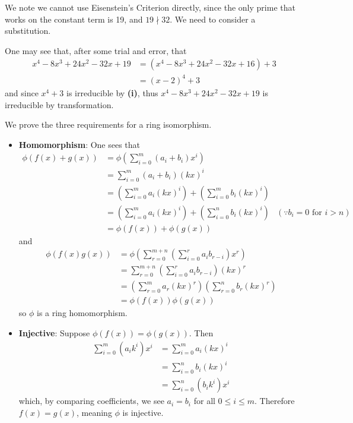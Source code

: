 \begin{questions}
\begin{partquestions}{\roman*}
        \item We note we cannot use Eisenstein's Criterion directly, since the only prime that works on the constant term is 19, and $19 \nmid 32$. We need to consider a substitution.

        One may see that, after some trial and error, that
        \begin{align*}
            x^4 - 8x^3 + 24x^2 - 32x + 19 &= (x^4 - 8x^3 + 24x^2 - 32x + 16) + 3\\
            &= (x - 2)^4 + 3
        \end{align*}
        and since $x^4 + 3$ is irreducible by \textbf{(i)}, thus $x^4 - 8x^3 + 24x^2 - 32x + 19$ is irreducible by transformation.
    \end{partquestions}

    \item We prove the three requirements for a ring isomorphism.
    \begin{itemize}
        \item \textbf{Homomorphism}: One sees that
        \begin{align*}
            \phi(f(x) + g(x)) &= \phi\left(\sum_{i=0}^m(a_i+b_i)x^i\right)\\
            &= \sum_{i=0}^m(a_i+b_i)(kx)^i\\
            &= \left(\sum_{i=0}^ma_i(kx)^i\right) + \left(\sum_{i=0}^mb_i(kx)^i\right)\\
            &= \left(\sum_{i=0}^ma_i(kx)^i\right) + \left(\sum_{i=0}^nb_i(kx)^i\right) & (\because b_i = 0 \text{ for } i > n)\\
            &= \phi(f(x)) + \phi(g(x))
        \end{align*}
        and
        \begin{align*}
            \phi(f(x)g(x)) &= \phi\left(\sum_{r=0}^{m+n}\left(\sum_{i=0}^ra_ib_{r-i}\right)x^r\right)\\
            &= \sum_{r=0}^{m+n}\left(\sum_{i=0}^ra_ib_{r-i}\right)(kx)^r\\
            &= \left(\sum_{r=0}^ma_r(kx)^r\right)\left(\sum_{r=0}^nb_r(kx)^r\right)\\
            &= \phi(f(x))\phi(g(x))
        \end{align*}
        so $\phi$ is a ring homomorphism.

        \item \textbf{Injective}: Suppose $\phi(f(x)) = \phi(g(x))$. Then
        \begin{align*}
            \sum_{i=0}^m(a_ik^i)x^i &= \sum_{i=0}^ma_i(kx)^i\\
            &= \sum_{i=0}^nb_i(kx)^i\\
            &= \sum_{i=0}^n(b_ik^i)x^i
        \end{align*}
        which, by comparing coefficients, we see $a_i = b_i$ for all $0 \leq i \leq m$. Therefore $f(x) = g(x)$, meaning $\phi$ is injective.


\end{itemize}
\end{questions}

